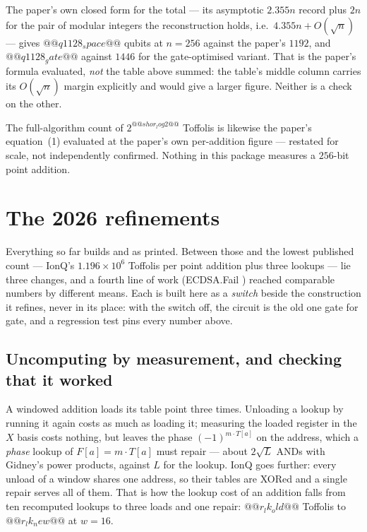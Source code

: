 The paper's own closed form for the total --- its asymptotic $2.355n$ record plus $2n$ for the pair
of modular integers the reconstruction holds, i.e.\ $4.355n+O(\sqrt n)$ --- gives
$@@q1128_space@@$ qubits at $n=256$ against the paper's $1192$, and $@@q1128_gate@@$ against $1446$
for the gate-optimised variant. That is the paper's formula evaluated, \emph{not} the table above
summed: the table's middle column carries its $O(\sqrt n)$ margin explicitly and would give a
larger figure. Neither is a check on the other.

The full-algorithm count of $2^{@@shor_log2@@}$ Toffolis is likewise the paper's equation~(1)
evaluated at the paper's own per-addition figure --- restated for scale, not independently
confirmed. Nothing in this package measures a $256$-bit point addition.

\section{The 2026 refinements}\label{ec:sec:refine}

Everything so far builds \cite{ec:kim26} and \cite{ec:schrott26} as printed. Between those and the
lowest published count --- IonQ's $1.196\times10^{6}$ Toffolis per point addition plus three
lookups \cite{ec:ionq26} --- lie three changes, and a fourth line of work (ECDSA.Fail
\cite{ec:ecdsafail26}) reached comparable numbers by different means. Each is built here as a
\emph{switch} beside the construction it refines, never in its place: with the switch off, the
circuit is the old one gate for gate, and a regression test pins every number above.

\subsection{Uncomputing by measurement, and checking that it worked}

A windowed addition loads its table point three times. Unloading a lookup by running it again costs
as much as loading it; measuring the loaded register in the $X$ basis costs nothing, but leaves the
phase $(-1)^{m\cdot T[a]}$ on the address, which a \emph{phase} lookup of $F[a]=m\cdot T[a]$ must
repair --- about $2\sqrt L$ ANDs with Gidney's power products, against $L$ for the lookup. IonQ
goes further: every unload of a window shares one address, so their tables are XORed and a single
repair serves all of them. That is how the lookup cost of an addition falls from ten recomputed
lookups to three loads and one repair: $@@r_lk_old@@$ Toffolis to $@@r_lk_new@@$ at $w=16$.

